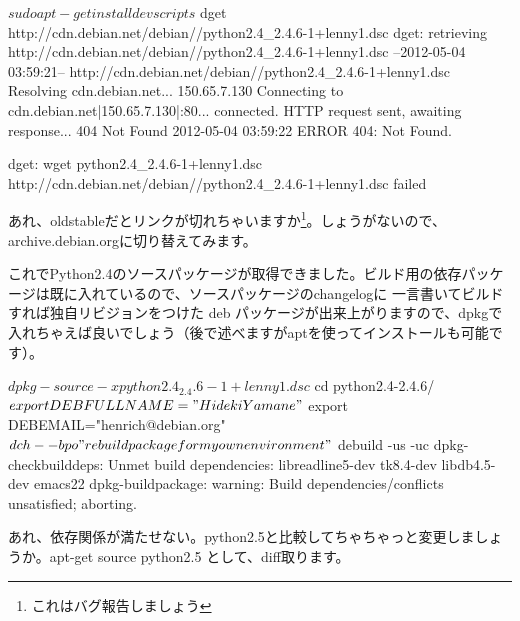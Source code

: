 \documentclass[mingoth,a4paper]{jsarticle}
\begin{document}
\begin{commandline}
$ sudo apt-get install devscripts
$ dget http://cdn.debian.net/debian//python2.4_2.4.6-1+lenny1.dsc
dget: retrieving http://cdn.debian.net/debian//python2.4_2.4.6-1+lenny1.dsc
--2012-05-04 03:59:21--  http://cdn.debian.net/debian//python2.4_2.4.6-1+lenny1.dsc
Resolving cdn.debian.net... 150.65.7.130
Connecting to cdn.debian.net|150.65.7.130|:80... connected.
HTTP request sent, awaiting response... 404 Not Found
2012-05-04 03:59:22 ERROR 404: Not Found.

dget: wget python2.4_2.4.6-1+lenny1.dsc http://cdn.debian.net/debian//python2.4_2.4.6-1+lenny1.dsc failed
\end{commandline}

あれ、oldstableだとリンクが切れちゃいますか\footnote{これはバグ報告しましょう}。しょうがないので、archive.debian.orgに切り替えてみます。

これでPython2.4のソースパッケージが取得できました。ビルド用の依存パッケージは既に入れているので、ソースパッケージのchangelogに
一言書いてビルドすれば独自リビジョンをつけた deb パッケージが出来上がりますので、dpkgで入れちゃえば良いでしょう（後で述べますがaptを使ってインストールも可能です）。

\begin{commandline}
$ dpkg-source -x python2.4_2.4.6-1+lenny1.dsc
$ cd python2.4-2.4.6/
$ export DEBFULLNAME="Hideki Yamane"
$ export DEBEMAIL="henrich@debian.org"
$ dch --bpo "rebuild package for my own environment"
$ debuild -us -uc
dpkg-checkbuilddeps: Unmet build dependencies: libreadline5-dev tk8.4-dev libdb4.5-dev emacs22
dpkg-buildpackage: warning: Build dependencies/conflicts unsatisfied; aborting.
\end{commandline}

あれ、依存関係が満たせない。python2.5と比較してちゃちゃっと変更しましょうか。apt-get source python2.5 として、diff取ります。
\end{document}
